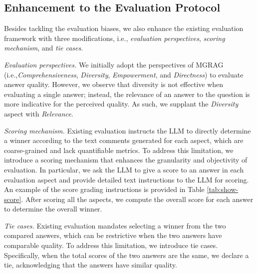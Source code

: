 \subsection{Enhancement to the Evaluation Protocol}
Besides tackling the evaluation biases, we also enhance the existing evaluation framework with three modifications, i.e., \textit{evaluation perspectives}, \textit{scoring mechanism}, and \textit{tie cases}.
\squishlist
    \item {\textit{Evaluation perspectives.}}
   We initially adopt the perspectives of MGRAG (i.e.,\textit{Comprehensiveness}, \textit{Diversity}, \textit{Empowerment}, and \textit{Directness}) to evaluate answer quality. However, we observe that diversity is not effective when evaluating a single answer; instead, the relevance of an answer to the question is more indicative for the perceived quality. As such, we supplant the \textit{Diversity} aspect with \textit{Relevance}.
\item {\textit{Scoring mechanism.}}
    Existing evaluation instructs the LLM to directly determine a winner according to the text comments generated for each aspect, which are coarse-grained and lack quantifiable metrics. To address this limitation, we introduce a scoring mechanism that enhances the granularity and objectivity of evaluation. In particular, we ask the LLM to give a score to an answer in each evaluation aspect and provide detailed text instructions to the LLM for scoring.
    An example of the score grading instructions is provided in Table \ref{tab:show-score}. After scoring all the aspects, we compute the overall score for each answer to determine the overall winner.
\item {\textit{Tie cases.}}
     Existing evaluation mandates selecting a winner from the two compared answers, which can be restrictive when the two answers have comparable quality. To address this limitation, we introduce tie cases. Specifically, when the total scores of the two answers are the same, we declare a tie, acknowledging that the answers have similar quality.
\squishend





    
        
